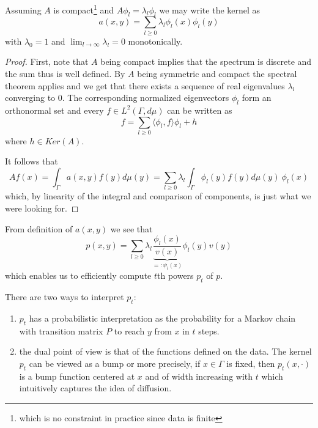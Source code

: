 \begin{theorem}
Assuming $A$ is compact\footnote{which is no constraint in practice since data is finite} and $A\phi_l=\lambda_l\phi_l$ we may write the kernel as
\begin{equation*}
a(x,y)=\sum_{l\geq 0}\lambda_l\phi_l(x)\phi_l(y)
\end{equation*}
with $\lambda_0 = 1$ and $\lim_{l\rightarrow\infty}\lambda_l = 0$ monotonically.
\end{theorem}
\begin{proof}
First, note that $A$ being compact implies that the spectrum is discrete and the sum thus is well defined. By $A$ being symmetric and compact the spectral theorem applies and we get that there exists a sequence of real eigenvalues $\lambda_l$ converging to $0$. The corresponding normalized eigenvectors $\phi_l$ form an orthonormal set and every $f\in L^2(\Gamma,d\mu)$ can be written as
$$f=\sum_{l\geq 0}\langle \phi_l,f\rangle \phi_l + h$$
where $h\in Ker(A)$.

It follows that
$$Af(x)=\int_\Gamma a(x,y)f(y)d\mu(y) = \sum_{l\geq 0}\lambda_l \int_\Gamma \phi_l(y)f(y)d\mu(y)\ \phi_l(x)$$
which, by linearity of the integral and comparison of components, is just what we were looking for.
\end{proof}
From definition of $a(x,y)$ we see that 
\begin{equation}\label{spectralDecompositionOfP}
p(x,y)=\sum_{l\geq 0}\lambda_l\underbrace{\frac{\phi_l(x)}{v(x)}}_{=:\psi_l(x)}\phi_l(y)v(y)
\end{equation}
 which enables us to efficiently compute $t$th powers $p_t$ of $p$.

There are two ways to interpret $p_t$:
\begin{enumerate}
\item $p_t$ has a probabilistic interpretation as the probability for a Markov chain with transition matrix $P$ to reach $y$ from $x$ in $t$ steps.
\item the dual point of view is that of the functions defined on the data. The kernel $p_t$ can be viewed as a bump or more precisely, if $x\in\Gamma$ is fixed, then $p_t(x, \cdotp)$ is a bump function centered at $x$ and of width increasing with $t$ which intuitively captures the idea of diffusion.
\end{enumerate}

